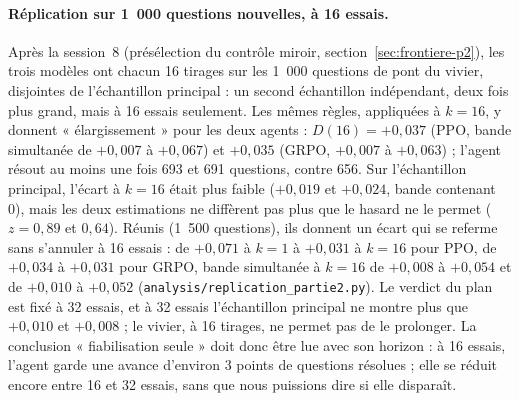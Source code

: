 \paragraph{Réplication sur 1~000 questions nouvelles, à 16 essais.} Après la session~8 (présélection du contrôle miroir, section~\ref{sec:frontiere-p2}), les trois modèles ont chacun 16 tirages sur les 1~000 questions de pont du vivier, disjointes de l'échantillon principal : un second échantillon indépendant, deux fois plus grand, mais à 16 essais seulement. Les mêmes règles, appliquées à $k = 16$, y donnent « élargissement » pour les deux agents : $D(16) = +0{,}037$ (PPO, bande simultanée de $+0{,}007$ à $+0{,}067$) et $+0{,}035$ (GRPO, $+0{,}007$ à $+0{,}063$) ; l'agent résout au moins une fois 693 et 691 questions, contre 656. Sur l'échantillon principal, l'écart à $k = 16$ était plus faible ($+0{,}019$ et $+0{,}024$, bande contenant 0), mais les deux estimations ne diffèrent pas plus que le hasard ne le permet ($z = 0{,}89$ et $0{,}64$). Réunis (1~500 questions), ils donnent un écart qui se referme sans s'annuler à 16 essais : de $+0{,}071$ à $k = 1$ à $+0{,}031$ à $k = 16$ pour PPO, de $+0{,}034$ à $+0{,}031$ pour GRPO, bande simultanée à $k = 16$ de $+0{,}008$ à $+0{,}054$ et de $+0{,}010$ à $+0{,}052$ (\texttt{analysis/replication\_partie2.py}). Le verdict du plan est fixé à 32 essais, et à 32 essais l'échantillon principal ne montre plus que $+0{,}010$ et $+0{,}008$ ; le vivier, à 16 tirages, ne permet pas de le prolonger. La conclusion « fiabilisation seule » doit donc être lue avec son horizon : à 16 essais, l'agent garde une avance d'environ 3 points de questions résolues ; elle se réduit encore entre 16 et 32 essais, sans que nous puissions dire si elle disparaît.

